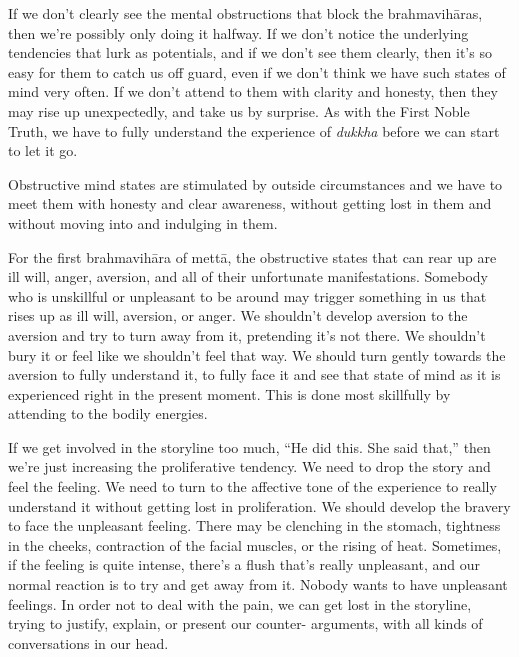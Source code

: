 If we don't clearly see the mental obstructions that block the brahmavihāras, then we're possibly only doing it halfway. If we don't notice the underlying tendencies that lurk as potentials, and if we don't see them clearly, then it's so easy for them to catch us off guard, even if we don't think we have such states of mind very often. If we don't attend to them with clarity and honesty, then they may rise up unexpectedly, and take us by surprise. As with the First Noble Truth, we have to fully understand the experience of \emph{dukkha} before \linebreak we can start to let it go.

Obstructive mind states are stimulated by outside circumstances and we have to meet them with honesty and clear awareness, without getting lost in them and without moving into and indulging in them.

For the first brahmavihāra of mettā, the obstructive states that can rear up are ill will, anger, aversion, and all of their unfortunate manifestations. Somebody who is unskillful or unpleasant to be around may trigger something in us that rises up as ill will, aversion, or anger. We shouldn't develop aversion to the aversion and try to turn away from it, pretending it's not there. We shouldn't bury it or feel like we shouldn't feel that way. We should turn gently towards the aversion to fully understand it, to fully face it and see that state of mind as it is experienced right in the present moment. This is done most skillfully by attending to the bodily energies.

\enlargethispage{-1\baselineskip}
If we get involved in the storyline too much, ``He did this. She said that,'' then we're just increasing the proliferative tendency. We need to drop the story and feel the feeling. We need to turn to the affective tone of the experience to really understand it without getting lost in proliferation. We should develop the bravery to face the unpleasant feeling. There may be clenching in the stomach, tightness in the cheeks, contraction of the facial muscles, or the rising of heat. Sometimes, if the feeling is quite intense, there's a flush that's really unpleasant, and our normal reaction is to try and get away from it. Nobody wants to have unpleasant feelings. In order not to deal with the pain, we can get lost in the storyline, trying to justify, explain, or present our counter- \linebreak arguments, with all kinds of conversations in our head.{\parfillskip=0pt \par}

